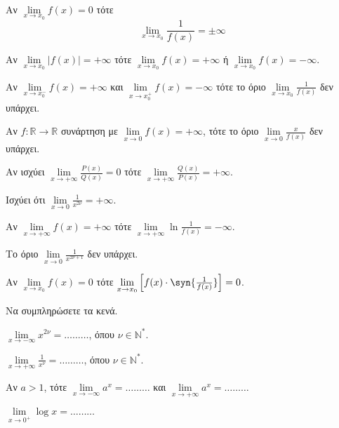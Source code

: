 \documentclass[ektypwsh]{frontisthrio-diag}
\begin{document}
\begin{thema}
\item\mbox{}\\\vspace{-7mm}
\begin{erwthma}
\item \swstolathospan
\begin{alist}
\item Αν $ \lim\limits_{x\to x_0}{f(x)}=0 $ τότε 
\[ \lim_{x\to x_0}{\frac{1}{f(x)}}=\pm \infty \]
\item Αν $ \lim\limits_{x\to x_0}{|f(x)|}=+\infty $ τότε $ \lim\limits_{x\to x_0}{f(x)}=+\infty $ ή $ \lim\limits_{x\to x_0}{f(x)}=-\infty $.
\item Αν $ \lim\limits_{x\to x_0^-}{f(x)}=+\infty $ και $ \lim\limits_{x\to x_0^+}{f(x)}=-\infty $ τότε το όριο $ \lim\limits_{x\to x_0}{\frac{1}{f(x)}} $ δεν υπάρχει.
\item Αν $ f:\mathbb{R}\to\mathbb{R} $ συνάρτηση με $ \lim\limits_{x\to 0}{f(x)}=+\infty $, τότε το όριο $ \lim\limits_{x\to 0}{\frac{x}{f(x)}} $ δεν υπάρχει.
\item Αν ισχύει $ \lim\limits_{x\to +\infty}{\frac{P(x)}{Q(x)}}=0 $ τότε $ \lim\limits_{x\to +\infty}{\frac{Q(x)}{P(x)}}=+\infty $.
\item Ισχύει ότι $ \lim\limits_{x\to 0}{\frac{1}{x^{2\nu}}}=+\infty $.
\item Αν $ \lim\limits_{x\to+\infty}{f(x)}=+\infty $ τότε $ \lim\limits_{x\to +\infty}{\ln{\frac{1}{f(x)}}}=-\infty $.
\item Το όριο $ \lim\limits_{x\to 0}{\frac{1}{x^{2\nu+1}}} $ δεν υπάρχει.
\item Αν $ \lim\limits_{x\to x_0}{f(x)}=0 $ τότε $ \lim\limits_{x\to x_0}{\left[f(x)\cdot\syn{\frac{1}{f(x)}}\right]}=0 $.
\end{alist}
\item Να συμπληρώσετε τα κενά.
\begin{alist}
\item $ \lim\limits_{x\to -\infty}{x^{2\nu}}=\ldots\ldots\ldots $, όπου $ \nu\in\mathbb{N}^* $.
\item $ \lim\limits_{x\to +\infty}{\frac{1}{x^{\nu}}}=\ldots\ldots\ldots $, όπου $ \nu\in\mathbb{N}^* $.
\item Αν $ a>1 $, τότε $ \lim\limits_{x\to -\infty}{a^x}=\ldots\ldots\ldots $ και $ \lim\limits_{x\to +\infty}{a^x}=\ldots\ldots\ldots $
\item $ \lim\limits_{x\to 0^+}{\log{x}}=\ldots\ldots\ldots $
\end{alist}

\end{erwthma}
\end{thema}
\end{document}

